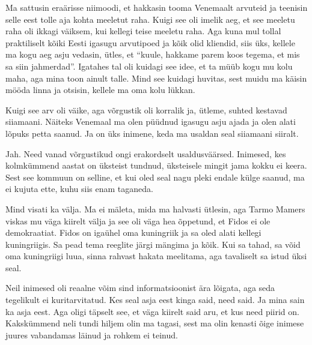 
Ma sattusin eraärisse niimoodi, et  hakkasin tooma Venemaalt arvuteid ja teenisin selle eest tolle aja kohta meeletut raha. Kuigi see oli imelik aeg, et see meeletu raha oli ikkagi väiksem, kui kellegi teise meeletu raha. Aga kuna mul  tollal praktiliselt kõiki Eesti igasugu arvutipoed ja kõik olid kliendid, siis  üks, kellele ma kogu aeg asju vedasin, ütles, et \enquote{kuule,  hakkame parem koos tegema, et mis sa siin jahmerdad}. Igatahes tal oli kuidagi see idee, et ta müüb kogu mu kolu maha, aga mina toon ainult talle. Mind see kuidagi huvitas, sest muidu ma käisin mööda linna ja otsisin, kellele ma oma kolu lükkan. 


Kuigi see arv oli väike, aga võrgustik oli korralik ja, ütleme, suhted kestavad siiamaani. Näiteks Venemaal ma olen püüdnud igasugu asju ajada ja olen alati lõpuks petta saanud. Ja  on üks inimene, keda ma usaldan seal siiamaani siiralt. 


Jah. Need vanad võrgustikud ongi erakordselt usaldusväärsed. Inimesed, kes kolmkümmend aastat on üksteist tundnud, üksteisele mingit jama kokku ei keera. Sest see kommuun on selline, et kui oled seal nagu pleki endale külge saanud, ma ei kujuta ette, kuhu siis enam  taganeda. 


Mind  visati ka välja. Ma ei mäleta, mida ma halvasti ütlesin, aga Tarmo Mamers viskas mu väga kiirelt välja ja see oli väga hea õppetund, et Fidos ei ole demokraatiat. Fidos on igaühel oma kuningriik ja sa oled alati kellegi kuningriigis. Sa pead tema reeglite järgi mängima ja kõik. Kui sa tahad, sa võid oma kuningriigi luua, sinna rahvast hakata meelitama, aga tavaliselt sa istud üksi seal. 


Neil inimesed oli reaalne võim sind informatsioonist ära lõigata, aga seda tegelikult ei kuritarvitatud. Kes seal asja eest kinga said, need said. Ja mina sain ka asja eest. Aga oligi täpselt see, et väga kiirelt said aru, et kus need piirid on. Kakskümmend neli tundi hiljem olin ma tagasi, sest ma olin kenasti õige inimese juures vabandamas läinud ja rohkem ei teinud. 

